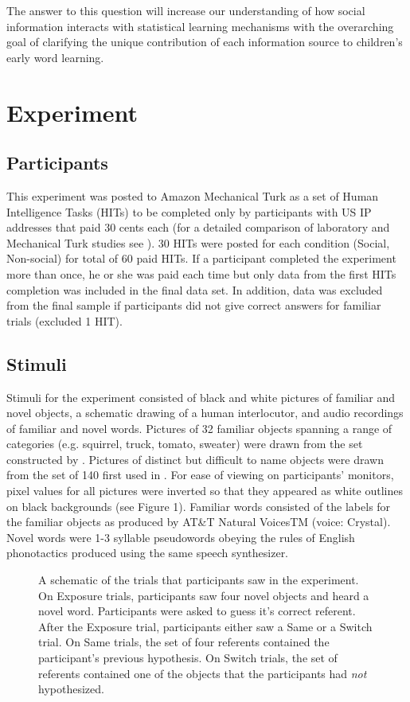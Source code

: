 \documentclass[man]{apa2}
\begin{document}
The answer to this question will increase our understanding of how social information interacts with statistical learning mechanisms with the overarching goal of clarifying the unique contribution of each information source to children's early word learning. 



\section{Experiment}

\subsection{Participants}

This experiment was posted to Amazon Mechanical Turk as a set of
Human Intelligence Tasks (HITs) to be completed only by participants with US IP
addresses that paid 30 cents each (for a detailed comparison of laboratory and Mechanical
Turk studies see ). 30 HITs were posted for each
condition (Social, Non-social) for total of 60 paid HITs. If a participant
completed the experiment more than once, he or she was paid each time but only data
from the first HITs completion was included in the final data set. In
addition, data was excluded from the final sample if participants did not give correct
answers for familiar trials (excluded 1 HIT).

\subsection{Stimuli}

Stimuli for the experiment consisted of black and white pictures of familiar
and novel objects, a schematic drawing of a human interlocutor, and audio recordings of familiar and novel words. Pictures of 32 familiar objects spanning a range of categories (e.g. squirrel, truck, tomato, sweater) were drawn from the set constructed by . Pictures of distinct but
difficult to name objects were drawn from the set of 140 first used in . For ease of viewing on participants' monitors, pixel values for all pictures were inverted so that they appeared as white outlines on black backgrounds (see Figure 1). Familiar words consisted of the labels for the familiar objects as produced by AT&T Natural VoicesTM (voice: Crystal). Novel words were 1-3 syllable pseudowords obeying the rules of English phonotactics produced using the same speech synthesizer.
%
\begin{figure}
	\centering
	\caption{A schematic of the trials that participants saw in the experiment. On Exposure trials, participants saw four novel objects and heard a novel word. Participants were asked to guess it's correct referent. After the Exposure trial, participants either saw a Same or a Switch trial. On Same trials, the set of four referents contained the participant's previous hypothesis. On Switch trials, the set of referents contained one of the objects that the participants had \emph{not} hypothesized.}
\end{figure}
\end{document}
